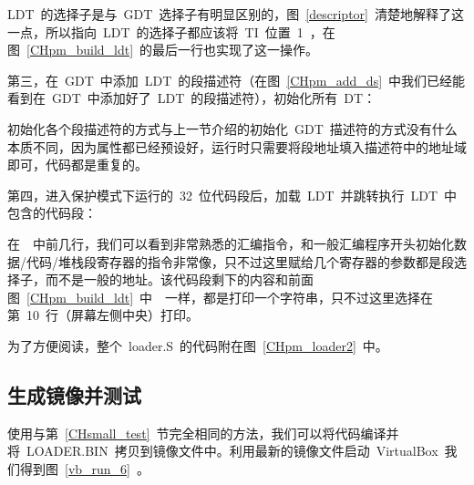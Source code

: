 LDT~的选择子是与~GDT~选择子有明显区别的，图~\ref{descriptor}~清楚地解释了这一点，所以指向~LDT~的选择子都应该将~TI~位置~1~，在图~\ref{CHpm_build_ldt}~的最后一行也实现了这一操作。

第三，在~GDT~中添加~LDT~的段描述符（在图~\ref{CHpm_add_ds}~中我们已经能看到在~GDT~中添加好了~LDT~的段描述符），初始化所有~DT：

\label{CHpm_init_dts}

初始化各个段描述符的方式与上一节介绍的初始化~GDT~描述符的方式没有什么本质不同，因为属性都已经预设好，运行时只需要将段地址填入描述符中的地址域即可，代码都是重复的。

第四，进入保护模式下运行的~32~位代码段后，加载~LDT~并跳转执行~LDT~中包含的代码段：

\label{CHpm_run_ldt}

在~~中前几行，我们可以看到非常熟悉的汇编指令，和一般汇编程序开头初始化数据/代码/堆栈段寄存器的指令非常像，只不过这里赋给几个寄存器的参数都是段选择子，而不是一般的地址。该代码段剩下的内容和前面图~\ref{CHpm_build_ldt}~中~~一样，都是打印一个字符串，只不过这里选择在第~10~行（屏幕左侧中央）打印。

为了方便阅读，整个~loader.S~的代码附在图~\ref{CHpm_loader2}~中。

\label{CHpm_loader2}

\subsection{生成镜像并测试}

使用与第~\ref{CHsmall_test}~节完全相同的方法，我们可以将代码编译并将~LOADER.BIN~拷贝到镜像文件中。利用最新的镜像文件启动~VirtualBox~我们得到图~\ref{vb_run_6}~。



